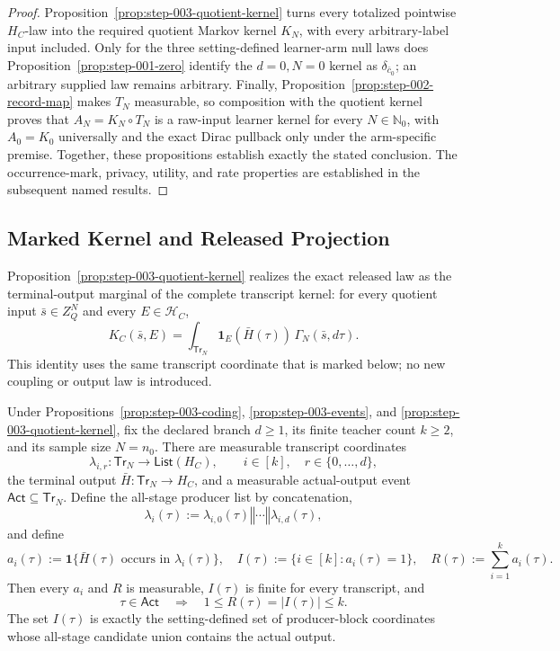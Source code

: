\begin{proof}
Proposition~\ref{prop:step-003-quotient-kernel} turns every totalized
pointwise \(H_C\)-law into the required quotient Markov kernel \(K_N\), with
every arbitrary-label input included. Only for the three setting-defined
learner-arm null laws does Proposition~\ref{prop:step-001-zero} identify the
\(d=0,N=0\) kernel as \(\delta_{\bar c_0}\); an arbitrary supplied law
remains arbitrary. Finally, Proposition~\ref{prop:step-002-record-map} makes
\(T_N\) measurable, so composition with the quotient kernel proves that
\(A_N=K_N\circ T_N\) is a raw-input learner kernel for every
\(N\in\mathbb N_0\), with \(A_0=K_0\) universally and the exact Dirac
pullback only under the arm-specific premise. Together, these propositions
establish exactly the stated conclusion.
The occurrence-mark, privacy, utility, and rate properties are established
in the subsequent named results.



\end{proof}

\subsection{Marked Kernel and Released Projection}\label{app:step_004}

Proposition~\ref{prop:step-003-quotient-kernel} realizes the exact released
law as the terminal-output marginal of the complete transcript kernel: for
every quotient input \(\bar s\in Z_Q^N\) and every
\(E\in\mathcal H_C\),
\[
 K_C(\bar s,E)
 =\int_{\mathsf{Tr}_N}
   \mathbf1_E(\bar H(\tau))\,\Gamma_N(\bar s,d\tau).
\tag{1}
\]
This identity uses the same transcript coordinate that is marked below; no
new coupling or output law is introduced.


 \begin{lemma}\label{lem:step-004-occurrence}
Under  Propositions~\ref{prop:step-003-coding},
\ref{prop:step-003-events}, and
\ref{prop:step-003-quotient-kernel}, fix the declared branch \(d\geq1\),
its finite teacher count \(k\geq2\), and its sample size \(N=n_0\). There
are measurable transcript coordinates
\[
\lambda_{i,r}:\mathsf{Tr}_N\longrightarrow
\mathsf{List}(H_C),
\qquad i\in[k],\quad r\in\{0,\ldots,d\},
\tag{2}
\]
the terminal output \(\bar H:\mathsf{Tr}_N\to H_C\), and a measurable
actual-output event \(\mathsf{Act}\subseteq\mathsf{Tr}_N\). Define the
all-stage producer list by concatenation,
\[
\lambda_i(\tau)
:=\lambda_{i,0}(\tau)\mathbin{\Vert}\cdots
  \mathbin{\Vert}\lambda_{i,d}(\tau),
\tag{3}
\]
and define
\[
a_i(\tau):=
\mathbf1\{\bar H(\tau)\text{ occurs in }\lambda_i(\tau)\},
\quad
I(\tau):=\{i\in[k]:a_i(\tau)=1\},
\quad
R(\tau):=\sum_{i=1}^k a_i(\tau).
\tag{4}
\]
Then every \(a_i\) and \(R\) is measurable, \(I(\tau)\) is finite for
every transcript, and
\[
\tau\in\mathsf{Act}\quad\Longrightarrow\quad
1\leq R(\tau)=|I(\tau)|\leq k.
\tag{5}
\]
The set \(I(\tau)\) is exactly the setting-defined set of producer-block
coordinates whose all-stage candidate union contains the actual output.


\end{lemma}

